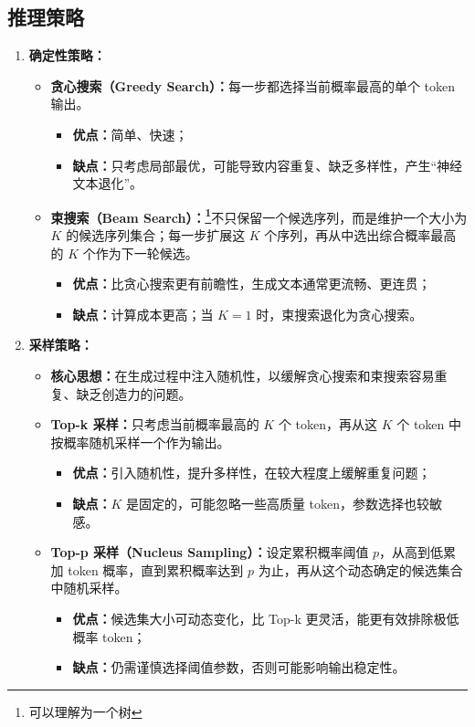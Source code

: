 \documentclass[../main.tex]{subfiles}
\begin{document}
\subsection{推理策略}\label{sec:decoding-strategy}
\begin{enumerate}
    \item \textbf{确定性策略：}
    \begin{itemize}
        \item \textbf{贪心搜索（Greedy Search）：}每一步都选择当前概率最高的单个 token 输出。
        \begin{itemize}
            \item \textbf{优点：}简单、快速；
            \item \textbf{缺点：}只考虑局部最优，可能导致内容重复、缺乏多样性，产生“神经文本退化”。
        \end{itemize}

        \item \textbf{束搜索（Beam Search）：\footnote{可以理解为一个树}}不只保留一个候选序列，而是维护一个大小为 $K$ 的候选序列集合；每一步扩展这 $K$ 个序列，再从中选出综合概率最高的 $K$ 个作为下一轮候选。
        \begin{itemize}
            \item \textbf{优点：}比贪心搜索更有前瞻性，生成文本通常更流畅、更连贯；
            \item \textbf{缺点：}计算成本更高；当 $K=1$ 时，束搜索退化为贪心搜索。
        \end{itemize}
    \end{itemize}

    \item \textbf{采样策略：}
    \begin{itemize}
        \item \textbf{核心思想：}在生成过程中注入随机性，以缓解贪心搜索和束搜索容易重复、缺乏创造力的问题。

        \item \textbf{Top-k 采样：}只考虑当前概率最高的 $K$ 个 token，再从这 $K$ 个 token 中按概率随机采样一个作为输出。
        \begin{itemize}
            \item \textbf{优点：}引入随机性，提升多样性，在较大程度上缓解重复问题；
            \item \textbf{缺点：}$K$ 是固定的，可能忽略一些高质量 token，参数选择也较敏感。
        \end{itemize}

        \item \textbf{Top-p 采样（Nucleus Sampling）：}设定累积概率阈值 $p$，从高到低累加 token 概率，直到累积概率达到 $p$ 为止，再从这个动态确定的候选集合中随机采样。
        \begin{itemize}
            \item \textbf{优点：}候选集大小可动态变化，比 Top-k 更灵活，能更有效排除极低概率 token；
            \item \textbf{缺点：}仍需谨慎选择阈值参数，否则可能影响输出稳定性。
        \end{itemize}
    \end{itemize}


\end{enumerate}
\end{document}
